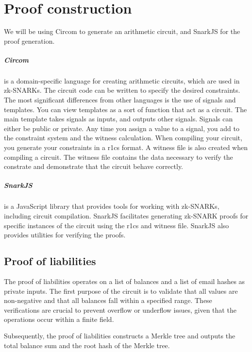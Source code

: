 
\chapter{Proof construction}
We will be using Circom to generate an arithmetic circuit, and SnarkJS for the proof generation.

\paragraph{Circom} is a domain-specific language for creating arithmetic circuits, which are used in zk-SNARKs.
The circuit code can be written to specify the desired constraints.
The most significant differences from other languages is the use of signals and templates. 
You can view templates as a sort of function that act as a circuit. 
The main template takes signals as inputs, and outputs other signals. Signals can either be public or private.
Any time you assign a value to a signal, you add to the constraint system and the witness calculation.
When compiling your circuit, you generate your constraints in a r1cs format.
A witness file is also created when compiling a circuit. The witness file contains the data necessary to verify the constrate and demonstrate that the circuit behave correctly.


\paragraph{SnarkJS} is a JavaScript library that provides tools for working with zk-SNARKs, including circuit compilation.
SnarkJS facilitates generating zk-SNARK proofs for specific instances of the circuit using the r1cs and witness file.
SnarkJS also provides utilities for verifying the proofs.


\section{Proof of liabilities}
\label{subsec:pl}
The proof of liabilities operates on a list of balances and a list of email hashes as private inputs.
The first purpose of the circuit is to validate that all values are non-negative and that all balances fall within a specified range.
These verifications are crucial to prevent overflow or underflow issues, given that the operations occur within a finite field.

Subsequently, the proof of liabilities constructs a Merkle tree and outputs the total balance sum and the root hash of the Merkle tree.

